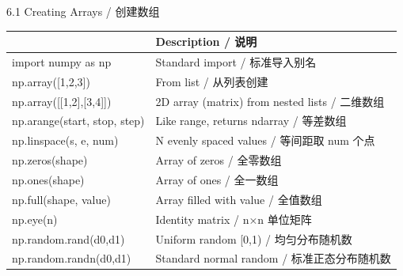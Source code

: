 \documentclass[11pt,a4paper]{report}
\begin{document}
\begin{cmdsection}{6.1  Creating Arrays / 创建数组}
\normalsize\renewcommand{\arraystretch}{1.4}
\centering
\begin{tabularx}{\textwidth}{@{}>{\ttfamily}l>{\raggedright\arraybackslash}X@{}}
\toprule
\multicolumn{1}{@{}l}{\textbf{Syntax}} & \textbf{Description / 说明} \\ \midrule
import numpy as np          & Standard import / 标准导入别名 \\
np.array([1,2,3])           & From list / 从列表创建 \\
np.array([[1,2],[3,4]])     & 2D array (matrix) from nested lists / 二维数组 \\
np.arange(start, stop, step)& Like range, returns ndarray / 等差数组 \\
np.linspace(s, e, num)      & N evenly spaced values / 等间距取 num 个点 \\
np.zeros(shape)             & Array of zeros / 全零数组 \\
np.ones(shape)              & Array of ones / 全一数组 \\
np.full(shape, value)       & Array filled with value / 全值数组 \\
np.eye(n)                   & Identity matrix / n×n 单位矩阵 \\
np.random.rand(d0,d1)       & Uniform random [0,1) / 均匀分布随机数 \\
np.random.randn(d0,d1)      & Standard normal random / 标准正态分布随机数 \\
\bottomrule
\end{tabularx}
\end{cmdsection}
\end{document}
